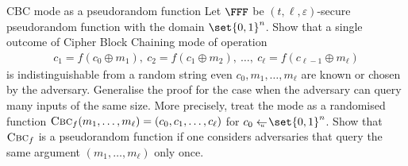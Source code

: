 \documentclass{crypto-exercise}
\author{Sven Laur}
\begin{document}
\begin{exercise}{CBC mode as a pseudorandom function}
Let $\FFF$ be $(t,\ell,\varepsilon)$-secure pseudorandom function with the domain $\set{0,1}^n$. Show that a single outcome of Cipher Block Chaining mode of operation
\begin{align*}
c_1=f(c_0\oplus m_1),\ c_2=f(c_1\oplus m_2),\ \ldots,\ c_\ell=f(c_{\ell-1}\oplus m_\ell)
\end{align*}
is indistinguishable from a random string even $c_0,m_1,\ldots, m_{\ell}$ are known or chosen by the adversary. Generalise the proof for the case when the adversary can query many inputs of the same size.
More precisely, treat the mode as a randomised function $\textsc{Cbc}_f(m_1,\ldots,m_{\ell})=(c_0, c_1,\ldots,c_\ell)$ for $c_0\getsu\set{0,1}^n$. Show that  $\textsc{Cbc}_f$ is a pseudorandom function if one considers adversaries that query the same argument $(m_1,\ldots,m_\ell)$ only once.
\end{exercise}
\end{document}
